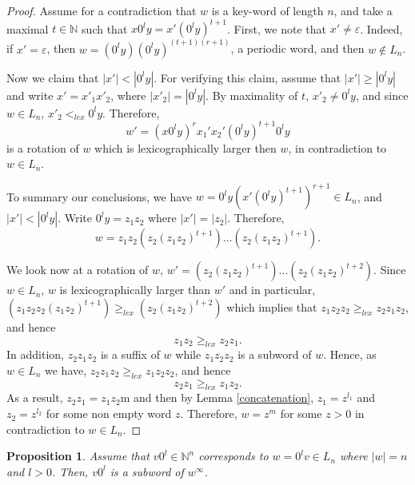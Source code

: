 \documentclass{article}
\newtheorem{proposition}[theorem]{Proposition}
\theoremstyle{definition}
\newcommand{\N}{{\mathbb{N}}}
\begin{document}
\begin{proof}
Assume for a contradiction that $w$ is a key-word of length $n$, and take a maximal $t\in \N$ such that $x0^ly=x'(0^ly)^{t+1}$. First, we note that $x'\neq \varepsilon$. Indeed, if $x'=\varepsilon$, then $w=(0^ly)(0^ly)^{(t+1)(r+1)}$, a periodic word, and then $w\notin L_n$.

Now we claim that $|x'|<|0^ly|$. For verifying this claim, assume that $|x'|\geq |0^ly|$ and write $x'=x'_1x'_2$, where $|x'_2|=|0^ly|$. By maximality of $t$, $x'_2\neq 0^ly$, and since $w\in L_n$, $x'_2<_{lex} 0^ly$. Therefore, $$w'=(x0^ly)^rx_1'x_2'(0^ly)^{t+1}0^ly$$ is a rotation of $w$ which is lexicographically larger then $w$, in contradiction to $w\in L_n$.

To summary our conclusions, we have $w=0^ly(x'(0^ly)^{t+1})^{r+1}\in L_n$, and $|x'|<|0^ly|$. Write $0^ly=z_1z_2$ where $|x'|=|z_2|$. Therefore, $$w=z_1z_2(z_2(z_1z_2)^{t+1})\dots(z_2(z_1z_2)^{t+1}).$$ 

We look now at a rotation of $w$, $w'=(z_2(z_1z_2)^{t+1})\dots(z_2(z_1z_2)^{t+2})$. Since $w\in L_n$, $w$ is lexicographically larger than $w'$ and in particular,
$(z_1z_2z_2(z_1z_2)^{t+1})\geq_{lex}(z_2(z_1z_2)^{t+2})$ which implies that
$z_1z_2z_2\geq_{lex}z_2z_1z_2$, and hence
$$z_1z_2\geq_{lex}z_2z_1.$$
In addition, $z_2z_1z_2$ is a suffix of $w$ while $z_1z_2z_2$ is a subword of $w$. Hence, as $w\in L_n$ we have, $z_2z_1z_2\geq_{lex} z_1z_2z_2$, and hence
$$z_2z_1\geq_{lex}z_1z_2.$$
As a result, $z_2z_1=z_1z_2$m and then by Lemma \ref{concatenation}, $z_1=z^{l_1}$ and $z_2=z^{l_2}$ for some non empty word $z$. Therefore, $w=z^m$ for some $z>0$ in contradiction to $w\in L_n$. 


\end{proof}

\begin{proposition}
Assume that $v0^l\in\mathbb{N}^n$ corresponds to $w=0^lv\in L_n$ where $|w|=n$ and $l>0$. Then, $v0^l$ is a subword of $w^\infty$. 
\end{proposition}
\end{document}
